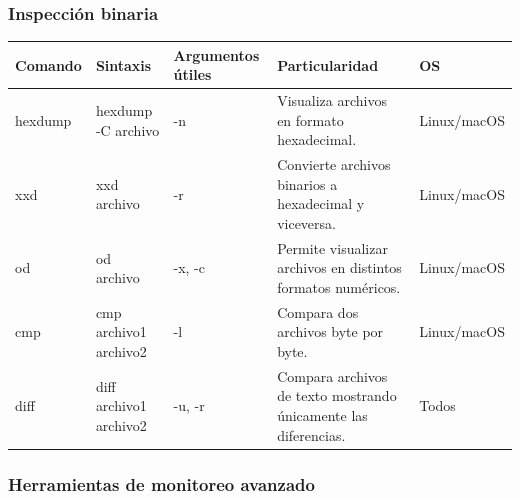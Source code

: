 \documentclass[a4paper,10pt]{article}
\begin{document}

\subsubsection{Inspección binaria}

\begin{longtable}{|p{2.8cm}|p{3.3cm}|p{4cm}|p{5.3cm}|p{1.5cm}|}

\hline
Comando &
Sintaxis &
Argumentos útiles &
Particularidad &
OS
\\
\hline
\endhead

hexdump &
hexdump -C archivo &
-n &
Visualiza archivos en formato hexadecimal.
&
Linux/macOS
\\
\hline

xxd &
xxd archivo &
-r &
Convierte archivos binarios a hexadecimal y viceversa.
&
Linux/macOS
\\
\hline

od &
od archivo &
-x, -c &
Permite visualizar archivos en distintos formatos numéricos.
&
Linux/macOS
\\
\hline

cmp &
cmp archivo1 archivo2 &
-l &
Compara dos archivos byte por byte.
&
Linux/macOS
\\
\hline

diff &
diff archivo1 archivo2 &
-u, -r &
Compara archivos de texto mostrando únicamente las diferencias.
&
Todos
\\
\hline

\end{longtable}




\subsubsection{Herramientas de monitoreo avanzado}
\end{document}
